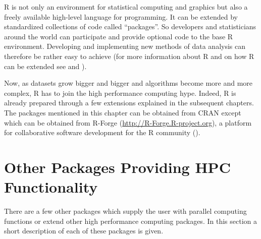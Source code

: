 R is not only an environment for statistical computing and graphics
but also a freely available high-level language for programming. It
can be extended by standardized collections of code called
``packages''. So developers and statisticians around the world can
participate and provide optional code to the base R environment.
Developing and implementing new methods of data analysis can therefore
be rather easy to achieve (for more information about R and on how R can
be extended see \cite{hornik07Rfaq} and \cite{Rcore07Ext}). 


Now, as datasets grow bigger and bigger and algorithms become more and more
complex, R has to join the high performance computing hype. Indeed, R
is already prepared through a few extensions explained in the
subsequent chapters. The packages mentioned in this chapter can be
obtained from CRAN except  which can be obtained from
R-Forge (\url{http://R-Forge.R-project.org}), a platform for
collaborative software development for the R community
(\cite{theussl07R-Forge}).









\section{Other Packages Providing HPC Functionality}
\label{sec:otherpackages}
There are a few other packages which supply the user with parallel
computing functions or extend other high performance computing
packages. In this section a short description of each of these
packages is given.

